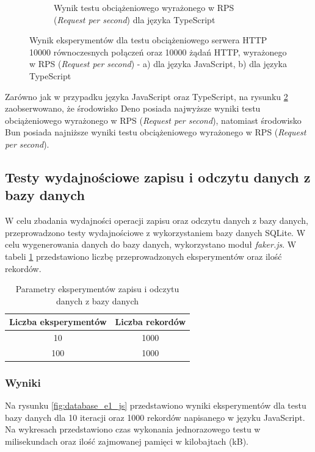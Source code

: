 \begin{figure}[H]
\begin{subfigure}[b]{0.44\textwidth}
    \caption{Wynik testu obciążeniowego wyrażonego w RPS (\textit{Request per second}) dla języka TypeScript}
    \label{fig:server_e3_ts}
  \end{subfigure}
  \hfill
  \caption{Wynik eksperymentów dla testu obciążeniowego serwera HTTP 10000 równoczesnych połączeń oraz 10000 żądań HTTP, wyrażonego w RPS (\textit{Request per second}) - a) dla języka JavaScript, b) dla języka TypeScript}
  \label{fig:server_e3}
\end{figure}

Zarówno jak w przypadku języka JavaScript oraz TypeScript, na rysunku \ref{fig:server_e3} zaobserwowano, że środowisko Deno posiada najwyższe wyniki testu obciążeniowego wyrażonego w RPS (\textit{Request per second}), natomiast środowisko Bun posiada najniższe wyniki testu obciążeniowego wyrażonego w RPS (\textit{Request per second}).

\subsection{Testy wydajnościowe zapisu i odczytu danych z bazy danych}
W celu zbadania wydajności operacji zapisu oraz odczytu danych z bazy danych, przeprowadzono testy wydajnościowe z wykorzystaniem bazy danych SQLite. W celu wygenerowania danych do bazy danych, wykorzystano moduł \textit{faker.js}. W tabeli \ref{tab:database_experiments} przedstawiono liczbę przeprowadzonych eksperymentów oraz ilość rekordów.

\begin{table}[H]
  \centering
  \caption{Parametry eksperymentów zapisu i odczytu danych z bazy danych \cite{sqlite_performance}}
  \begin{tabular}{|c|c|}
    \hline
    \textbf{Liczba eksperymentów} & \textbf{Liczba rekordów}\\ \hline
    10 & 1000 \\ \hline
    100 & 1000 \\ \hline
  \end{tabular}
  \label{tab:database_experiments}
\end{table}

\subsubsection{Wyniki}
Na rysunku \ref{fig:database_e1_js} przedstawiono wyniki eksperymentów dla testu bazy danych dla 10 iteracji oraz 1000 rekordów napisanego w języku JavaScript. Na wykresach przedstawiono czas wykonania jednorazowego testu w milisekundach oraz ilość zajmowanej pamięci w kilobajtach (kB).

